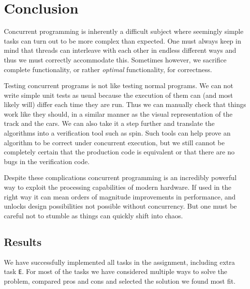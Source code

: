 \section{Conclusion}

Concurrent programming is inherently a difficult subject where seemingly simple tasks can turn out to be more complex than expected. One must always keep in mind that threads can interleave with each other in endless different ways and thus we must correctly accommodate this. Sometimes however, we sacrifice complete functionality, or rather \emph{optimal} functionality, for correctness.

Testing concurrent programs is not like testing normal programs. We can not write simple unit tests as usual because the execution of them can (and most likely will) differ each time they are run. Thus we can manually check that things work like they should, in a similar manner as the visual representation of the track and the cars. We can also take it a step further and translate the algorithms into a verification tool such as spin. Such tools can help prove an algorithm to be correct under concurrent execution, but we still cannot be completely certain that the production code is equivalent or that there are no bugs in the verification code.

Despite these complications concurrent programming is an incredibly powerful way to exploit the processing capabilities of modern hardware. If used in the right way it can mean orders of magnitude improvements in performance, and unlocks design possibilities not possible without concurrency. But one must be careful not to stumble as things can quickly shift into chaos.

\subsection{Results}
We have successfully implemented all tasks in the assignment, including extra task \texttt{E}. For most of the tasks we have considered multiple ways to solve the problem, compared pros and cons and selected the solution we found most fit.


